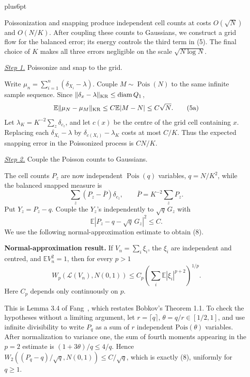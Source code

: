 \documentclass[11pt,reqno]{amsart}
\makeatletter
\theoremstyle{plain}
\theoremstyle{definition}
\theoremstyle{remark}
\renewenvironment{proof}[1][\proofname]{%
  \par
  \pushQED{\qed}%
  \normalfont
  \topsep6pt plus6pt\relax
  \trivlist
  \item[\hskip\labelsep\slshape #1\@addpunct{.}]%
  \ignorespaces
}{%
  \popQED
  \endtrivlist
  \@endpefalse
}
\DeclareRobustCommand{\qed}{%
  \leavevmode\unskip\penalty9999\hbox{}\nobreak
  \ifmmode
    \makebox[0pt][l]{\qquad\hbox{\qedsymbol}}%
  \else
    \qquad\hbox{\qedsymbol}%
  \fi
}
\renewcommand{\qedsymbol}{\rule[.47pt]{4pt}{6pt}}
\numberwithin{equation}{section}
\newcommand{\1}{\mathbf 1}
\makeatother
\begin{document}
\begin{proof}
Poissonization and snapping produce independent cell counts at costs
$O(\sqrt N)$ and $O(N/K)$.  After coupling these counts to Gaussians,
we construct a grid flow for the balanced error; its energy controls the
third term in (5).  The final choice of $K$ makes all three errors
negligible on the scale $\sqrt{N\log N}$.

\smallskip\noindent
\underline{\textit{Step 1.}} Poissonize and snap to the grid.

Write $\mu_ n=\sum_ {i=1}^n(\delta_ {X_ i}-\lambda)$.  Couple
$M\sim\operatorname {Pois}(N)$ to the same infinite sample sequence.
Since $\|\delta_ x-\lambda\|_ {\rm KR}\leq\operatorname {diam}Q_ 1$,
\begin{equation}
\mathbb E\|\mu_ N-\mu_ M\|_ {\rm KR}
\leq C\mathbb E|M-N|\leq C\sqrt N.
\tag{5a}
\end{equation}
Let $\lambda_ K=K^{-2}\sum_ z\delta_ {c_ z}$, and let $c(x)$ be the
centre of the grid cell containing $x$.  Replacing each
$\delta_ {X_ i}-\lambda$ by
$\delta_ {c(X_ i)}-\lambda_ K$ costs at most $C/K$.  Thus the expected
snapping error in the Poissonized process is $CN/K$.

\smallskip\noindent
\underline{\textit{Step 2.}} Couple the Poisson counts to Gaussians.

The cell counts $P_ z$ are now independent
$\operatorname {Pois}(q)$ variables, $q=N/K^2$, while the balanced
snapped measure is
\begin{equation}
\sum_ z(P_ z-\bar P)\delta_ {c_ z},\qquad
\bar P=K^{-2}\sum_ zP_ z.
\tag{5b}
\end{equation}
Put $Y_ z=P_ z-q$. Couple the $Y_ z$'s independently to
$\sqrt q\,G_ z$
with
\begin{equation}
\mathbb E|P_ z-q-\sqrt q\,G_ z|^2\leq C.
\tag{8}
\end{equation}
We use the following normal-approximation estimate to obtain (8).

\textbf{Normal-approximation result.} If $V_ n=\sum_ i\xi_ i$, the $\xi_ i$
are independent and centred, and $\mathbb EV_ n^2=1$, then for every
$p>1$
\begin{equation*}
W_ p(\mathcal L(V_ n),N(0,1))
\leq C_ p\left(\sum_ i\mathbb E|\xi_ i|^{p+2}\right)^{1/p}.
\end{equation*}
Here $C_ p$ depends only continuously on $p$.

This is Lemma 3.4 of Fang~\cite{Fang2019}, which restates Bobkov's Theorem 1.1. To check the hypotheses without a limiting argument, let
$r=\lceil q\rceil$, $\theta=q/r\in[1/2,1]$, and use infinite divisibility to
write $P_ q$ as a sum of $r$ independent $\mathrm {Pois}(\theta)$
variables.  After normalization to variance one, the sum of fourth
moments appearing in the $p=2$ estimate is
$(1+3\theta)/q\leq4/q$.  Hence
$W_ 2((P_ q-q)/\sqrt q,N(0,1))\leq C/\sqrt q$, which is exactly
(8), uniformly for $q\geq1$.


\end{proof}
\end{document}

